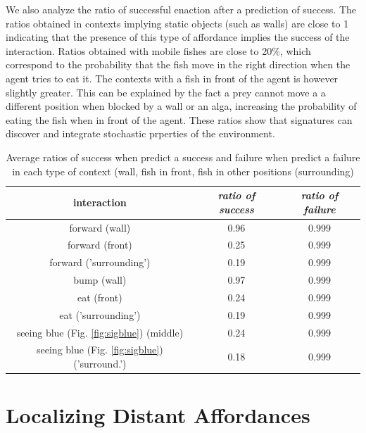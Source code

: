 \documentclass[conference]{IEEEtran}
\begin{document}
We also analyze the ratio of successful enaction after a prediction of success. The ratios obtained in contexts implying static objects (such as walls) are close to 1 indicating that the presence of this type of affordance implies the success of the interaction. Ratios obtained with mobile fishes are close to 20\%, which correspond to the probability that the fish move in the right direction when the agent tries to eat it. The contexts with a fish in front of the agent is however slightly greater. This can be explained by the fact a prey cannot move a a different position when blocked by a wall or an alga, increasing the probability of eating the fish when in front of the agent. These ratios show that signatures can discover and integrate stochastic prperties of the environment.


\begin{table}[htbp]
\caption{Average ratios of success when predict a success and failure when predict a failure in each type of context (wall, fish in front, fish in other positions (surrounding)}
\begin{center}
\begin{tabular}{|c|c|c|}
\hline 
\textbf{interaction} & \textbf{\textit{ratio of success}}& \textbf{\textit{ratio of failure}} \\
\hline
forward (wall)& 0.96 &  0.999 \\
\hline
forward (front)& 0.25& 0.999 \\
\hline
forward ('surrounding')& 0.19 & 0.999 \\
\hline
bump (wall)& 0.97 & 0.999 \\
\hline
eat (front)& 0.24 & 0.999 \\
\hline
eat ('surrounding')& 0.19 & 0.999 \\
\hline
seeing blue (Fig. \ref{fig:sigblue}) (middle)& 0.24 & 0.999 \\
\hline
seeing blue (Fig. \ref{fig:sigblue}) ('surround.')& 0.18 & 0.999 \\
\hline
\end{tabular}
\label{tab1}
\end{center}
\end{table}




\section{Localizing Distant Affordances}
\end{document}

